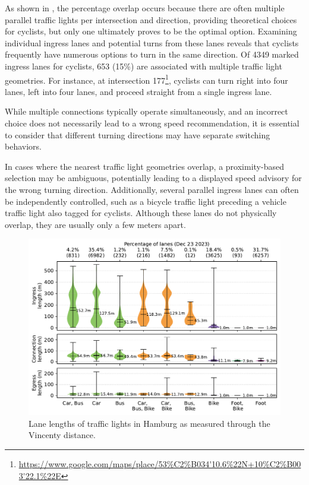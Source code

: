 As shown in , the percentage overlap occurs because there are often multiple parallel traffic lights per intersection and direction, providing theoretical choices for cyclists, but only one ultimately proves to be the optimal option. Examining individual ingress lanes and potential turns from these lanes reveals that cyclists frequently have numerous options to turn in the same direction. Of 4349 marked ingress lanes for cyclists, 653 (15\%) are associated with multiple traffic light geometries. For instance, at intersection 177\footnote{\url{https://www.google.com/maps/place/53\%C2\%B034'10.6\%22N+10\%C2\%B003'22.1\%22E}}, cyclists can turn right into four lanes, left into four lanes, and proceed straight from a single ingress lane.

While multiple connections typically operate simultaneously, and an incorrect choice does not necessarily lead to a wrong speed recommendation, it is essential to consider that different turning directions may have separate switching behaviors.

In cases where the nearest traffic light geometries overlap, a proximity-based selection may be ambiguous, potentially leading to a displayed speed advisory for the wrong turning direction. Additionally, several parallel ingress lanes can often be independently controlled, such as a bicycle traffic light preceding a vehicle traffic light also tagged for cyclists. Although these lanes do not physically overlap, they are usually only a few meters apart.

\begin{figure}[t]
\centering
\includegraphics[width=\linewidth]{images/lanes-lengths.pdf}
\caption{Lane lengths of traffic lights in Hamburg as measured through the Vincenty distance.}
\label{fig:ingress-lane-lengths}
\end{figure}

